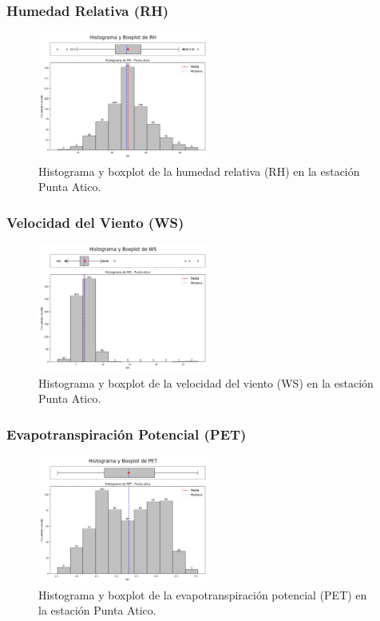 \subsubsection*{Humedad Relativa (RH)}
\begin{figure}[H]
\centering
\includegraphics[width=0.5\textwidth]{resultados/por_estacion_meteorologica/Punta_Atico/RH_histograma.png}
\caption{Histograma y boxplot de la humedad relativa (RH) en la estación Punta Atico.}
\label{fig:punta_atico_RH}
\end{figure}

\subsubsection*{Velocidad del Viento (WS)}
\begin{figure}[H]
\centering
\includegraphics[width=0.5\textwidth]{resultados/por_estacion_meteorologica/Punta_Atico/WS_histograma.png}
\caption{Histograma y boxplot de la velocidad del viento (WS) en la estación Punta Atico.}
\label{fig:punta_atico_WS}
\end{figure}

\subsubsection*{Evapotranspiración Potencial (PET)}
\begin{figure}[H]
\centering
\includegraphics[width=0.5\textwidth]{resultados/por_estacion_meteorologica/Punta_Atico/PET_histograma.png}
\caption{Histograma y boxplot de la evapotranspiración potencial (PET) en la estación Punta Atico.}
\label{fig:punta_atico_PET}
\end{figure}

